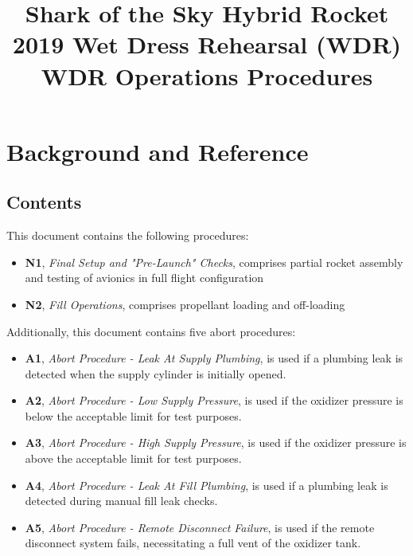 

\title{
\Huge Shark of the Sky Hybrid Rocket\\
2019 Wet Dress Rehearsal (WDR)\\
\vspace{1cm}
\Large WDR Operations Procedures}





\section{Background and Reference}

\subsection{Contents}
This document contains the following procedures:
\begin{itemize}
    \item \textbf{N1}, \textit{Final Setup and "Pre-Launch" Checks}, comprises partial rocket assembly and testing of avionics in full flight configuration
    \item \textbf{N2}, \textit{Fill Operations}, comprises propellant loading and off-loading
\end{itemize}
Additionally, this document contains five abort procedures:
\begin{itemize}
    \item \textbf{A1}, \textit{Abort Procedure - Leak At Supply Plumbing}, is used if a plumbing leak is detected when the supply cylinder is initially opened.
    \item \textbf{A2}, \textit{Abort Procedure - Low Supply Pressure}, is used if the oxidizer pressure is below the acceptable limit for test purposes.
    \item \textbf{A3}, \textit{Abort Procedure - High Supply Pressure}, is used if the oxidizer pressure is above the acceptable limit for test purposes.
    \item \textbf{A4}, \textit{Abort Procedure - Leak At Fill Plumbing}, is used if a plumbing leak is detected during manual fill leak checks.
    \item \textbf{A5}, \textit{Abort Procedure - Remote Disconnect Failure}, is used if the remote disconnect system fails, necessitating a full vent of the oxidizer tank.
\end{itemize}

